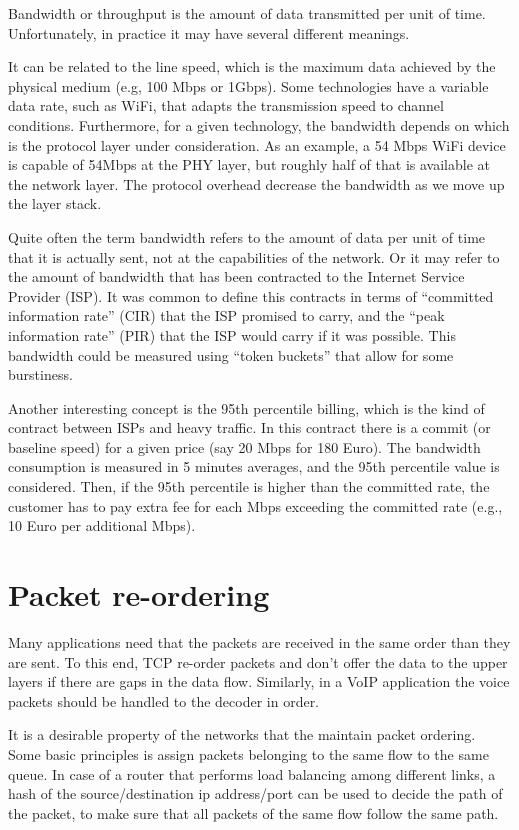 Bandwidth or throughput is the amount of data transmitted per unit of time.
Unfortunately, in practice it may have several different meanings.

It can be related to the line speed, which is the maximum data achieved by the physical medium (e.g, 100 Mbps or 1Gbps).
Some technologies have a variable data rate, such as WiFi, that adapts the transmission speed to channel conditions.
Furthermore, for a given technology, the bandwidth depends on which is the protocol layer under consideration.
As an example, a 54 Mbps WiFi device is capable of 54Mbps at the PHY layer, but roughly half of that is available at the network layer.
The protocol overhead decrease the bandwidth as we move up the layer stack.

Quite often the term bandwidth refers to the amount of data per unit of time that it is actually sent, not at the capabilities of the network.
Or it may refer to the amount of bandwidth that has been contracted to the Internet Service Provider (ISP).
It was common to define this contracts in terms of ``committed information rate'' (CIR) that the ISP promised to carry, and the ``peak information rate'' (PIR) that the ISP would carry if it was possible.
This bandwidth could be measured using ``token buckets'' that allow for some burstiness. 

Another interesting concept is the 95th percentile billing, which is the kind of contract between ISPs and heavy traffic.
In this contract there is a commit (or baseline speed) for a given price (say 20 Mbps for 180 Euro).
The bandwidth consumption is measured in 5 minutes averages, and the 95th percentile value is considered.
Then, if the 95th percentile is higher than the committed rate, the customer has to pay extra fee for each Mbps exceeding the committed rate (e.g., 10 Euro per additional Mbps).

\section{Packet re-ordering}

Many applications need that the packets are received in the same order than they are sent.
To this end, TCP re-order packets and don't offer the data to the upper layers if there are gaps in the data flow.
Similarly, in a VoIP application the voice packets should be handled to the decoder in order.

It is a desirable property of the networks that the maintain packet ordering.
Some basic principles is assign packets belonging to the same flow to the same queue.
In case of a router that performs load balancing among different links, a hash of the source/destination ip address/port can be used to decide the path of the packet, to make sure that all packets of the same flow follow the same path.

